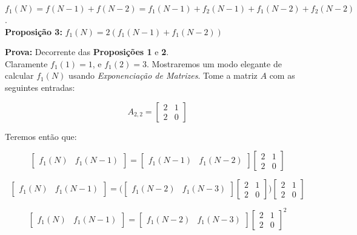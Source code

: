 $f_1(N) = f(N-1) + f(N-2) = f_1(N-1) + f_2(N-1) + f_1(N-2) + f_2(N-2)$.
\\


\textbf{Proposição 3:} $f_1(N) = 2(f_1(N-1) + f_1(N-2))$

\textbf{Prova: } Decorrente das \textbf{Proposições 1} e \textbf{2}.
\\

Claramente $f_1(1) = 1$, e $f_1(2) = 3$. Mostraremos um modo elegante de calcular $f_1(N)$ usando \textit{Exponenciação de Matrizes}.
Tome a matriz $A$ com as seguintes entradas:

\[ A_{2,2} = 
\begin{bmatrix}
       2 & 1           \\[0.3em]
       2 & 0    
\end{bmatrix}
\]

Teremos então que:

\[ 
\begin{bmatrix}
       f_1(N) & f_1(N-1)
\end{bmatrix}
=
\begin{bmatrix}
       f_1(N-1) & f_1(N-2)
\end{bmatrix}
\begin{bmatrix}
       2 & 1           \\[0.3em]
       2 & 0    
\end{bmatrix}
\]


\[ 
\begin{bmatrix}
       f_1(N) & f_1(N-1)
\end{bmatrix}
=
\bigg(
\begin{bmatrix}
       f_1(N-2) & f_1(N-3)
\end{bmatrix}
\begin{bmatrix}
       2 & 1           \\[0.3em]
       2 & 0    
\end{bmatrix}
\bigg)
\begin{bmatrix}
       2 & 1           \\[0.3em]
       2 & 0    
\end{bmatrix}
\]


\[ 
\begin{bmatrix}
       f_1(N) & f_1(N-1)
\end{bmatrix}
=
\begin{bmatrix}
       f_1(N-2) & f_1(N-3)
\end{bmatrix}
\begin{bmatrix}
       2 & 1           \\[0.3em]
       2 & 0    
\end{bmatrix}^2
\]

